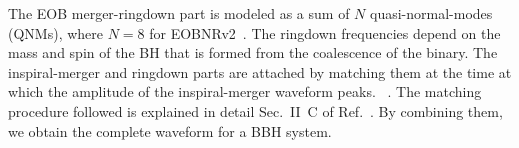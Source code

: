 The EOB merger-ringdown part is modeled as a sum of $N$ quasi-normal-modes 
(QNMs),
where $N=8$ for EOBNRv2~\citep{EOBNRdevel01,EOBNRdevel02,EOBNRdevel04,BHRDQNMs}.
The ringdown frequencies depend on the mass and spin of the BH that is formed 
from the coalescence of the binary. The inspiral-merger and ringdown parts are
attached by matching them at the time at which the amplitude of the 
inspiral-merger waveform peaks.
~\citep{EOBNRdevel01,BuonannoEOBv2Main}. The matching procedure followed
is explained in detail Sec.~II~C of Ref.~\citep{BuonannoEOBv2Main}.
By combining them, we obtain the complete waveform for a BBH system.
